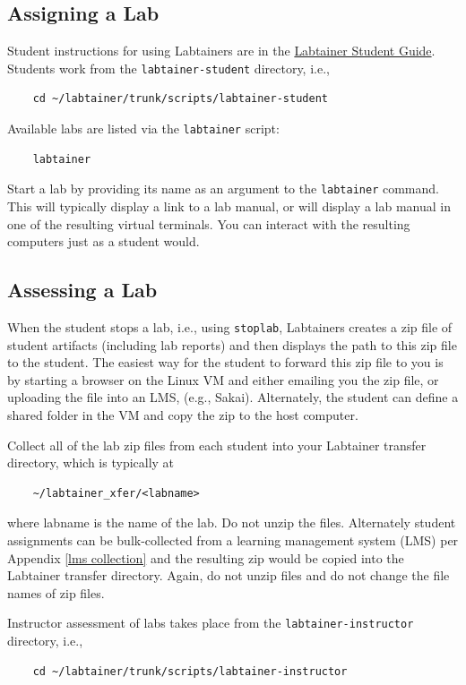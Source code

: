 \documentclass[12pt]{article}
\begin{document}
\subsection{Assigning a Lab}
Student instructions for using Labtainers are in the \underline{Labtainer Student Guide}.  
Students work from the {\tt labtainer-student} directory, i.e.,
\begin{verbatim}
    cd ~/labtainer/trunk/scripts/labtainer-student
\end{verbatim}
Available labs are listed via the {\tt labtainer} script:
\begin{verbatim}
    labtainer
\end{verbatim}
\noindent Start a lab by providing its name as an argument to the {\tt labtainer} command.
This will typically display a link to a lab manual, or will display a lab manual in one of
the resulting virtual terminals.  You can interact with the resulting computers just as a
student would.

\subsection{Assessing a Lab}
When the student stops a lab, i.e., using {\tt stoplab}, Labtainers creates a zip file of
student artifacts (including lab reports) and then displays the path to this zip file to
the student.  The easiest way for the student to forward this zip file to you is by starting
a browser on the Linux VM and either emailing you the zip file, or uploading the file
into an LMS, (e.g., Sakai).  Alternately, the student can define a shared folder in the VM
and copy the zip to the host computer.

Collect all of the lab zip files from each student into your Labtainer transfer directory, which
is typically at
\begin{verbatim}
    ~/labtainer_xfer/<labname>
\end{verbatim}
\noindent where labname is the name of the lab.  Do not unzip the files.  Alternately student
assignments can be bulk-collected from a learning management system (LMS) per Appendix \ref{lms collection}
and the resulting zip  would be copied into the
Labtainer transfer directory.  Again, do not unzip files and do not change the file names of zip files.

Instructor assessment of labs takes place from the {\tt labtainer-instructor} directory, i.e.,
\begin{verbatim}
    cd ~/labtainer/trunk/scripts/labtainer-instructor
\end{verbatim}
\end{document}
